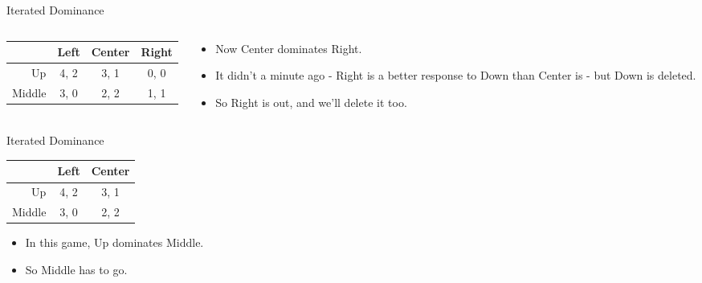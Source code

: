 \documentclass[
  14pt,
  letterpaper,
  ignorenonframetext,
  aspectratio=169,
]{beamer}
\providecommand{\tightlist}{%
  \setlength{\itemsep}{0pt}\setlength{\parskip}{0pt}}\usepackage{longtable,booktabs,array}
\let\olditem\item
\renewcommand{\item}{%
\olditem\vspace{6pt}}
\begin{document}
\begin{frame}{Iterated Dominance}
\protect\hypertarget{iterated-dominance-3}{}
\begin{columns}[T]
\begin{column}{0.5\textwidth}
\begin{table}[!h]
\centering
\begin{tabular}[t]{>{}r|ccc}
\toprule
 & Left & Center & Right\\
\midrule
Up & 4, 2 & 3, 1 & 0, 0\\
Middle & 3, 0 & 2, 2 & 1, 1\\
\bottomrule
\end{tabular}
\end{table}
\end{column}

\begin{column}{0.5\textwidth}
\begin{itemize}[<+->]
\tightlist
\item
  Now Center dominates Right.
\item
  It didn't a minute ago - Right is a better response to Down than
  Center is - but Down is deleted.
\item
  So Right is out, and we'll delete it too.
\end{itemize}
\end{column}
\end{columns}
\end{frame}

\begin{frame}{Iterated Dominance}
\protect\hypertarget{iterated-dominance-4}{}
\begin{table}[!h]
\centering
\begin{tabular}[t]{>{}r|cc}
\toprule
 & Left & Center\\
\midrule
Up & 4, 2 & 3, 1\\
Middle & 3, 0 & 2, 2\\
\bottomrule
\end{tabular}
\end{table}

\begin{itemize}[<+->]
\tightlist
\item
  In this game, Up dominates Middle.
\item
  So Middle has to go.
\end{itemize}
\end{frame}
\end{document}
